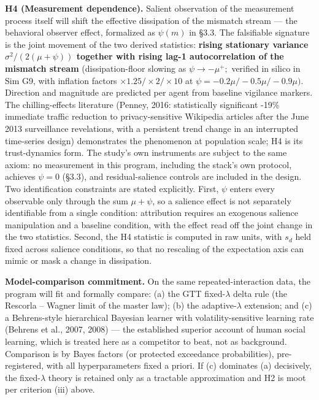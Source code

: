 \documentclass[11pt,twocolumn]{article}
\theoremstyle{gttdef}
\theoremstyle{gttplain}
\begin{document}
\textbf{H4 (Measurement dependence).} Salient observation of the measurement process itself will shift the effective dissipation of the mismatch stream --- the behavioral observer effect, formalized as $\psi(m)$ in \S{}3.3. The falsifiable signature is the joint movement of the two derived statistics: \textbf{rising stationary variance $\sigma^{2}/(2(\mu+\psi))$ together with rising lag-1 autocorrelation of the mismatch stream} (dissipation-floor slowing as $\psi \to -\mu^{+};$ verified in silico in Sim G9, with inflation factors $\times1.25 / \times2 / \times10$ at $\psi = -0.2\mu / -0.5\mu / -0.9\mu).$ Direction and magnitude are predicted per agent from baseline vigilance markers. The chilling-effects literature (Penney, 2016: statistically significant -19\% immediate traffic reduction to privacy-sensitive Wikipedia articles after the June 2013 surveillance revelations, with a persistent trend change in an interrupted time-series design) demonstrates the phenomenon at population scale; H4 is its trust-dynamics form. The study's own instruments are subject to the same axiom: no measurement in this program, including the stack's own protocol, achieves $\psi = 0$ (\S{}3.3), and residual-salience controls are included in the design. Two identification constraints are stated explicitly. First, $\psi$ enters every observable only through the sum $\mu + \psi$, so a salience effect is not separately identifiable from a single condition: attribution requires an exogenous salience manipulation and a baseline condition, with the effect read off the joint change in the two statistics. Second, the H4 statistic is computed in raw units, with $s_d$ held fixed across salience conditions, so that no rescaling of the expectation axis can mimic or mask a change in dissipation.

\textbf{Model-comparison commitment.} On the same repeated-interaction data, the program will fit and formally compare: (a) the GTT fixed-$\lambda$ delta rule (the Rescorla -- Wagner limit of the master law); (b) the adaptive-$\lambda$ extension; and (c) a Behrens-style hierarchical Bayesian learner with volatility-sensitive learning rate (Behrens et al., 2007, 2008) --- the established superior account of human social learning, which is treated here as a competitor to beat, not as background. Comparison is by Bayes factors (or protected exceedance probabilities), pre-registered, with all hyperparameters fixed a priori. If (c) dominates (a) decisively, the fixed-$\lambda$ theory is retained only as a tractable approximation and H2 is moot per criterion (iii) above.
\end{document}
